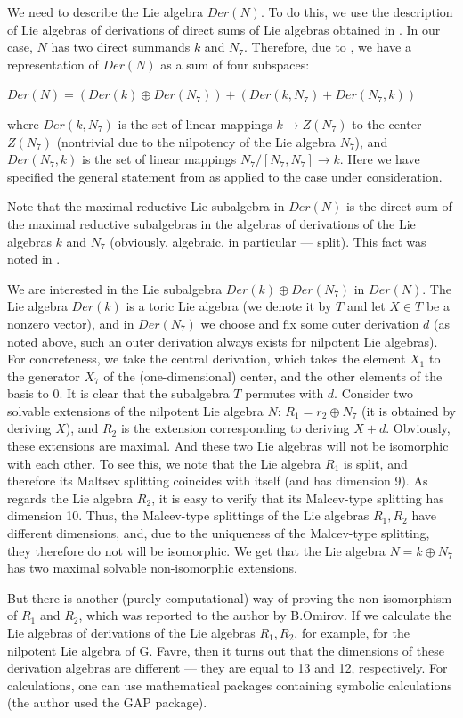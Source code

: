 \documentclass{amsart}
\begin{document}
We need to describe the Lie algebra $Der(N)$. To do this, we use the description of Lie algebras of derivations of direct sums of Lie algebras obtained in \cite {T}. In our case, $N$ has two direct summands $k$ and $N_7$. Therefore, due to \cite {T}, we have a representation of $Der(N)$ as a sum of four subspaces:

$Der(N)= (Der(k) \oplus Der(N_7))+ (Der(k, N_7)+Der(N_7,k))$

where $Der(k,N_7)$ is the set of linear mappings $k \to Z(N_7)$ to the center $Z(N_7)$ (nontrivial due to the nilpotency of the Lie algebra $N_7$), and $Der(N_7 ,k)$ is the set of linear mappings $N_7/[N_7,N_7] \to k$. Here we have specified the general statement from \cite {T} as applied to the case under consideration.

Note that the maximal reductive Lie subalgebra in $Der(N)$ is the direct sum of the maximal reductive subalgebras in the algebras of derivations of the Lie algebras $k$ and $N_7$ (obviously, algebraic, in particular --- split). This fact was noted in \cite {HO}.

We are interested in the Lie subalgebra $Der(k) \oplus Der (N_7)$ in $Der(N)$. The Lie algebra $Der(k)$ is a toric Lie algebra (we denote it by $T$ and let $X \in T$ be a nonzero vector), and in $Der(N_7)$ we choose and fix some outer derivation $d$ (as noted above, such an outer derivation always exists for nilpotent Lie algebras). For concreteness, we take the central derivation, which takes the element $X_1$ to the generator $X_7$ of the (one-dimensional) center, and the other elements of the basis to 0. It is clear that the subalgebra $T$ permutes with $d$. Consider two solvable extensions of the nilpotent Lie algebra $N$: $R_1=r_2\oplus N_7$ (it is obtained by deriving $X$), and $R_2$ is the extension corresponding to deriving $X+d$. Obviously, these extensions are maximal. And these two Lie algebras will not be isomorphic with each other. To see this, we note that the Lie algebra $R_1$ is split, and therefore its Maltsev splitting coincides with itself (and has dimension 9). As regards the Lie algebra $R_2$, it is easy to verify that its Malcev-type splitting has dimension 10. Thus, the Malcev-type splittings of the Lie algebras $R_1,R_2$ have different dimensions, and, due to the uniqueness of the Malcev-type splitting, they therefore do not will be isomorphic. We get that the Lie algebra $N=k \oplus N_7$ has two maximal solvable non-isomorphic extensions.


But there is another (purely computational) way of proving the non-isomorphism of $R_1$ and $R_2$, which was reported to the author by B.Omirov. If we calculate the Lie algebras of derivations of the Lie algebras $R_1,R_2$, for example, for the nilpotent Lie algebra of G. Favre, then it turns out that the dimensions of these derivation algebras are different --- they are equal to 13 and 12, respectively. For calculations, one can use mathematical packages containing  symbolic calculations (the author used the GAP package).
\end{document}
